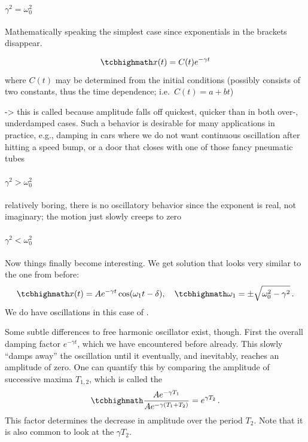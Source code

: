 \documentclass[../class_mech_main.tex]{subfiles}
\begin{document}
			\paragraph{$\gamma^2 = \omega_0^2$}
Mathematically speaking the simplest case since exponentials in the brackets disappear.

\begin{equation}
	\eqbox{
		x(t) = C(t) e^{- \gamma t}
	}
\end{equation}
where $C(t)$ may be determined from the initial conditions (possibly consists of two constants, thus the time dependence; i.e.~$C(t) = a + b t$)


-> this is called  because amplitude falls off quickest, quicker than in both over-, underdamped cases. Such a behavior is desirable for many applications in practice, e.g., damping in cars where we do not want continuous oscillation after hitting a speed bump, or a door that closes with one of those fancy pneumatic tubes



			\paragraph{$\gamma^2 > \omega_0^2$}
relatively boring, there is no oscillatory behavior since the exponent is real, not imaginary; the motion just slowly creeps to zero





			\paragraph{$\gamma^2 < \omega_0^2$}
Now things finally become interesting. We get solution that looks very similar to the one from before:
\begin{equation}
	\eqbox{
		x(t) = A e^{- \gamma t} \cos(\omega_1 t - \delta)
	}, \quad
	\eqbox{
		\omega_1 = \pm \sqrt{\omega_0^2 - \gamma^2}
	} \, .
\end{equation}
We do have oscillations in this case of .

Some subtle differences to free harmonic oscillator exist, though. First the overall damping factor $e^{- \gamma t}$, which we have encountered before already. This slowly \enquote{damps away} the oscillation until it eventually, and inevitably, reaches an amplitude of zero. One can quantify this by comparing the amplitude of successive maxima $T_{1, 2}$, which is called the 
\begin{equation}
	\eqbox{
		\frac{A e^{- \gamma T_1}}{A e^{- \gamma (T_1 + T_2)}} = e^{\gamma T_2}
	} \, .
\end{equation}
This factor determines the decrease in amplitude over the period $T_2$. Note that it is also common to look at the  $\gamma T_2$.
\end{document}
